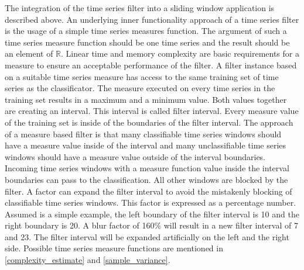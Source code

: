 The integration of the time series filter into a sliding window application is described above. An underlying inner
functionality approach of a time series filter is the usage of a simple time series measures function. The argument of
such a time series measure function should be one time series and the result should be an element of $\mathbb{R}$.
Linear time and memory complexity are basic requirements for a measure to ensure an acceptable performance of the
filter. A filter instance based on a suitable time series measure has access to the same training set of time series as
the classificator. The measure executed on every time series in the training set results in a maximum and a minimum
value. Both values together are creating an interval. This interval is called filter interval. Every measure value of the
training set is inside of the boundaries of the filter interval. The approach of a measure based filter is that many
classifiable time series windows should have a measure value inside of the interval and many unclassifiable time series
windows should have a measure value outside of the interval boundaries. Incoming time series windows with a measure
function value inside the interval boundaries can pass to the classification. All other windows are blocked by the
filter. A factor can expand the filter interval to avoid the mistakenly blocking of classifiable time series windows.
This factor is expressed as a percentage number. Assumed is a simple example, the left
boundary of the filter interval is 10 and the right boundary is 20. A blur factor of 160\% will result in a new filter
interval of 7 and 23. The filter interval will be expanded artificially on the left and the right side. Possible time
series measure functions are mentioned in \ref{complexity_estimate} and \ref{sample_variance}.
